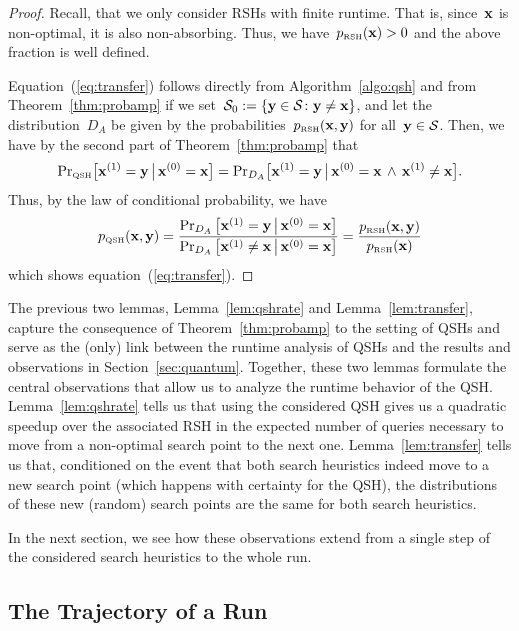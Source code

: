 \documentclass[a4paper,11pt]{article}
\begin{document}
\begin{proof}
Recall, that we only consider RSHs with finite runtime. That is, since~$\xvec$ is non-optimal, it is also non-absorbing. Thus, we have~$p_\RSH(\xvec)>0$ and the above fraction is well defined. 

Equation~(\ref{eq:transfer}) follows directly from Algorithm~\ref{algo:qsh} and from Theorem~\ref{thm:probamp} if we set~$\mathcal{S}_0:=\{\yvec\in\mathcal{S}\colon\yvec\neq\xvec\}$, and let the distribution~$D_A$ be given by the probabilities~$p_\RSH(\xvec,\yvec)$ for all~$\yvec\in\mathcal{S}$. Then, we have by the second part of Theorem~\ref{thm:probamp} that
\[
{\Pr}_\QSH\big[\xvec[1]=\yvec\bmid\xvec[0]=\xvec\big]={\Pr}_{D_A}\big[\xvec[1]=\yvec\bmid\xvec[0]=\xvec\,\wedge\,\xvec[1]\neq\xvec\big].
\]
Thus, by the law of conditional probability, we have
\[
p_\QSH(\xvec,\yvec)=\frac{\Pr_{D_A}\big[\xvec[1]=\yvec\bmid\xvec[0]=\xvec\big]}{\Pr_{D_A}\big[\xvec[1]\neq\xvec\bmid\xvec[0]=\xvec\big]}=\frac{p_\RSH(\xvec,\yvec)}{p_\RSH(\xvec)}
\]
which shows equation~(\ref{eq:transfer}).
\end{proof}


The previous two lemmas, Lemma~\ref{lem:qshrate} and Lemma~\ref{lem:transfer}, capture the consequence of Theorem~\ref{thm:probamp} to the setting of QSHs and serve as the (only) link between the runtime analysis of QSHs and the results and observations in Section~\ref{sec:quantum}. Together, these two lemmas formulate the central observations that allow us to analyze the runtime behavior of the QSH. Lemma~\ref{lem:qshrate} tells us that using the considered QSH gives us a quadratic speedup over the associated RSH in the expected number of queries necessary to move from a non-optimal search point to the next one. Lemma~\ref{lem:transfer} tells us that, conditioned on the event that both search heuristics indeed move to a new search point (which happens with certainty for the QSH), the distributions of these new (random) search points are the same for both search heuristics.

In the next section, we see how these observations extend from a single step of the considered search heuristics to the whole run.

\subsection{The Trajectory of a Run}\label{subsect:trajectories}
\end{document}
